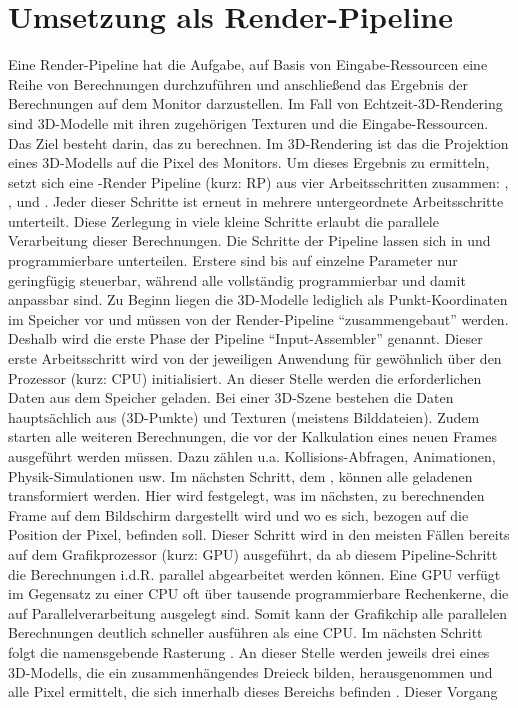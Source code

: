 	\section{Umsetzung als Render-Pipeline}
	\label{sec:RP}
	Eine Render-Pipeline hat die Aufgabe, auf Basis von Eingabe-Ressourcen eine Reihe von Berechnungen durchzuführen und anschließend das Ergebnis der Berechnungen auf dem Monitor darzustellen. Im Fall von Echtzeit-3D-Rendering sind 3D-Modelle mit ihren zugehörigen Texturen und  die Eingabe-Ressourcen. Das Ziel besteht darin, das  zu berechnen. Im 3D-Rendering ist das  die Projektion eines 3D-Modells auf die Pixel des Monitors. Um dieses Ergebnis zu ermitteln, setzt sich eine -Render Pipeline (kurz: \acs{RP}) aus vier Arbeitsschritten zusammen: , ,  und  \figref{\ref{fig:rasterizationpipeline}}. Jeder dieser Schritte ist erneut in mehrere untergeordnete Arbeitsschritte unterteilt. Diese Zerlegung in viele kleine Schritte erlaubt die parallele Verarbeitung dieser Berechnungen. Die Schritte der Pipeline lassen sich in  und programmierbare  unterteilen. Erstere sind bis auf einzelne Parameter nur geringfügig steuerbar, während alle  vollständig programmierbar und damit anpassbar sind. Zu Beginn liegen die 3D-Modelle lediglich als Punkt-Koordinaten im Speicher vor und müssen von der Render-Pipeline \enquote{zusammengebaut}  werden. Deshalb wird die erste Phase der Pipeline \enquote{Input-Assembler} genannt. Dieser erste Arbeitsschritt wird von der jeweiligen Anwendung für gewöhnlich über den Prozessor (kurz: \acs{CPU}) initialisiert. An dieser Stelle werden die erforderlichen Daten aus dem Speicher geladen. Bei einer 3D-Szene bestehen die Daten hauptsächlich aus  (3D-Punkte) und Texturen (meistens Bilddateien). Zudem starten alle weiteren Berechnungen, die vor der Kalkulation eines neuen Frames ausgeführt werden müssen. Dazu zählen u.a. Kollisions-Abfragen, Animationen, Physik-Simulationen usw. Im nächsten Schritt, dem , können alle geladenen  transformiert werden. Hier wird festgelegt, was im nächsten, zu berechnenden Frame auf dem Bildschirm dargestellt wird und wo es sich, bezogen auf die Position der Pixel, befinden soll. Dieser Schritt wird in den meisten Fällen bereits auf dem Grafikprozessor  (kurz: \acs{GPU}) ausgeführt, da ab diesem Pipeline-Schritt die Berechnungen i.d.R. parallel abgearbeitet werden können. Eine \acs{GPU} verfügt im Gegensatz zu einer \acs{CPU} oft über tausende programmierbare Rechenkerne, die auf Parallelverarbeitung ausgelegt sind. Somit kann der Grafikchip alle parallelen Berechnungen deutlich schneller ausführen als eine \acs{CPU}. Im nächsten Schritt folgt die namensgebende Rasterung . An dieser Stelle werden jeweils drei  eines 3D-Modells, die ein zusammenhängendes Dreieck  bilden, herausgenommen und alle Pixel ermittelt, die sich innerhalb dieses Bereichs befinden \figref{\ref{fig:rasterization}}. Dieser Vorgang 